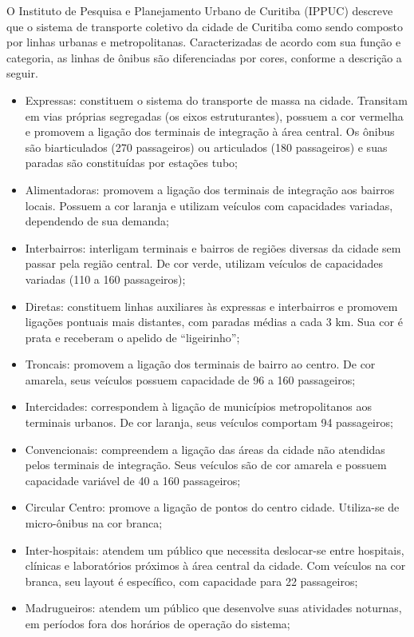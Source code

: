 \textcolor{clauciane}{
O Instituto de Pesquisa e Planejamento Urbano de Curitiba (IPPUC) descreve que o sistema de transporte coletivo da cidade de Curitiba como sendo composto por linhas urbanas e metropolitanas. Caracterizadas de acordo com sua função e categoria, as linhas de ônibus são diferenciadas por cores, conforme a descrição a seguir.
\begin{itemize}
    \item Expressas: constituem o sistema do transporte de massa na cidade. Transitam em vias próprias segregadas (os eixos estruturantes), possuem a cor vermelha e promovem a ligação dos terminais de integração à área central. Os ônibus são biarticulados (270 passageiros) ou articulados (180 passageiros) e suas paradas são constituídas por estações tubo; 
    \item Alimentadoras: promovem a ligação dos terminais de integração aos bairros locais. Possuem a cor laranja e utilizam veículos com capacidades variadas, dependendo de sua demanda; 
    \item Interbairros: interligam terminais e bairros de regiões diversas da cidade sem passar pela região central. De cor verde, utilizam veículos de capacidades variadas (110 a 160 passageiros);
    \item Diretas: constituem linhas auxiliares às expressas e interbairros e promovem ligações pontuais mais distantes, com paradas médias a cada 3 km. Sua cor é prata e receberam o apelido de “ligeirinho”; 
    \item Troncais: promovem a ligação dos terminais de bairro ao centro. De cor amarela, seus veículos possuem capacidade de 96 a 160 passageiros;
  \item Intercidades: correspondem à ligação de municípios metropolitanos aos terminais urbanos. De cor laranja, seus veículos comportam 94 passageiros;
 \item Convencionais: compreendem a ligação das áreas da cidade não atendidas pelos terminais de integração. Seus veículos são de cor amarela e possuem capacidade variável de 40 a 160 passageiros;
  \item Circular Centro: promove a ligação de pontos do centro cidade. Utiliza-se de micro-ônibus na cor branca; 
  \item Inter-hospitais: atendem um público que necessita deslocar-se entre hospitais, clínicas e laboratórios próximos à área central da cidade. Com veículos na cor branca, seu layout é específico, com capacidade para 22 passageiros; 
 \item Madrugueiros: atendem um público que desenvolve suas atividades noturnas, em períodos fora dos horários de operação do sistema; 

\end{itemize}}
